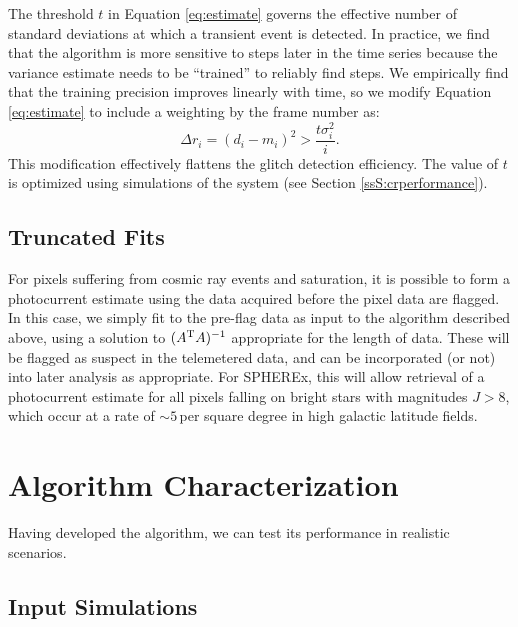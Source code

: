 \documentclass{ws-jai}
\begin{document}
The threshold $t$ in Equation \ref{eq:estimate} governs the effective
number of standard deviations at which a transient event is detected.
In practice, we find that the algorithm is more sensitive to steps
later in the time series because the variance estimate needs to be
``trained'' to reliably find steps.  We empirically find that the
training precision improves linearly with time, so we modify Equation
\ref{eq:estimate} to include a weighting by the frame number as:
%
\begin{equation}
  \label{eq:newestimate}
  \Delta r_{i} = (d_{i} - m_{i})^{2} > \frac{t \sigma^{2}_{i}}{i}.
\end{equation}
%
This modification effectively flattens the glitch detection
efficiency.  The value of $t$ is optimized using simulations of the
system (see Section \ref{ssS:crperformance}).

\subsection{Truncated Fits}
\label{sS:truncatedfits}

For pixels suffering from cosmic ray events and saturation, it is
possible to form a photocurrent estimate using the data acquired
before the pixel data are flagged.  In this case, we simply fit to the
pre-flag data as input to the algorithm described above, using a
solution to $(A^{\rm T} A)^{-1}$ appropriate for the length of data.
These will be flagged as suspect in the telemetered data, and can be
incorporated (or not) into later analysis as appropriate.  For
SPHEREx, this will allow retrieval of a photocurrent estimate for all
pixels falling on bright stars with magnitudes $J > 8$, which occur at
a rate of $\sim 5 \,$per square degree in high galactic latitude
fields.


\section{Algorithm Characterization}
\label{S:testing}

Having developed the algorithm, we can test its performance
in realistic scenarios.  

\subsection{Input Simulations}
\label{sS:input}
\end{document}
